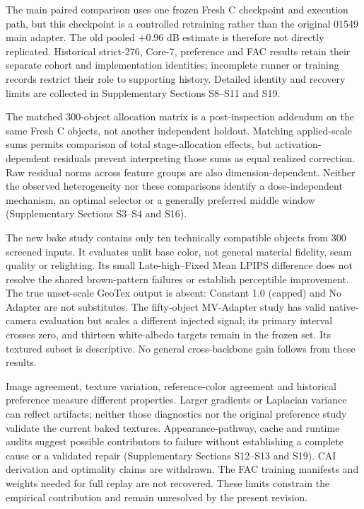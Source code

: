 \documentclass[times,twocolumn,final]{elsarticle}
\providecommand{\DIFadd}[1]{{\protect\color{blue} \sf #1}} %
\providecommand{\DIFaddbegin}{} %
\providecommand{\DIFaddend}{} %
\begin{document}
  \DIFaddbegin \DIFadd{The main paired comparison uses one frozen Fresh C checkpoint and execution path, but this checkpoint is a controlled retraining rather than the original 01549 main adapter}\DIFaddend . \DIFaddbegin \DIFadd{The old pooled $+0.96$ dB estimate is therefore not directly replicated. Historical strict-276, Core-7, preference and FAC results retain their separate cohort and implementation identities; incomplete runner or training records restrict their role to supporting history. Detailed identity and recovery limits are collected in Supplementary Sections S8--S11 and S19.
}\DIFaddend 

  \DIFaddbegin \DIFadd{The matched 300-object allocation matrix is a post-inspection addendum on the same Fresh C objects, not another independent holdout. Matching applied-scale sums permits comparison of total stage-allocation effects, but activation-dependent residuals prevent interpreting those sums as equal realized correction. Raw residual norms across feature groups are also dimension-dependent. Neither the observed heterogeneity nor these comparisons identify a dose-independent mechanism, an optimal selector or a generally preferred middle window (Supplementary Sections S3--S4 }\DIFaddend and   \DIFaddbegin \DIFadd{S16)}\DIFaddend .

  \DIFaddbegin \DIFadd{The new bake study contains only ten technically compatible objects from 300 screened inputs. It evaluates unlit base color, not general material fidelity, seam quality or relighting. Its small Late-high--Fixed Mean LPIPS difference does not resolve the shared brown-pattern failures or establish perceptible improvement. The true unset-scale GeoTex output is absent: Constant 1.0 (capped) and No Adapter are not substitutes. The fifty-object MV-Adapter study has valid native-camera evaluation but scales a different injected signal; its primary interval crosses zero, and thirteen white-albedo targets remain in the frozen set. Its textured subset is descriptive. No general cross-backbone gain follows from these results.
}\DIFaddend 

  \DIFaddbegin \DIFadd{Image agreement, texture variation, reference-color agreement and historical preference measure different properties. Larger gradients or Laplacian variance can reflect artifacts; neither those diagnostics nor the original preference study validate the current baked textures. Appearance-pathway, cache and runtime audits suggest possible contributors to failure without establishing a complete cause or a validated repair (Supplementary Sections S12--S13 and S19). CAI derivation and optimality claims are withdrawn. The FAC training manifests and weights needed for full replay are not recovered. These limits constrain the empirical contribution and remain unresolved by the present revision.
}\DIFaddend 
\end{document}
